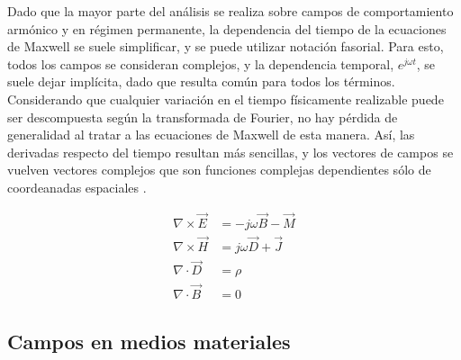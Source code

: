 Dado que la mayor parte del análisis se realiza sobre campos de comportamiento armónico y en régimen permanente, la dependencia del tiempo de la ecuaciones de Maxwell se suele simplificar, y se puede utilizar notación fasorial. Para esto, todos los campos se consideran complejos, y la dependencia temporal, $e^{j \omega t}$, se suele dejar implícita, dado que resulta común para todos los términos. Considerando que cualquier variación en el tiempo físicamente realizable puede ser descompuesta según la transformada de Fourier, no hay pérdida de generalidad al tratar a las ecuaciones de Maxwell de esta manera. Así, las derivadas respecto del tiempo resultan más sencillas, y los vectores de campos se vuelven vectores complejos que son funciones complejas dependientes sólo de coordeanadas espaciales \cite{Collin:GuidedWaves}.

\begin{subequations}
	\label{eq:maxwell_equations_harmonic}
	\begin{align}	
	\nabla \times \vec{E} & = -j \omega \vec{B} - \vec{M} \label{eq:Faraday_harmonic}\\
	\nabla \times \vec{H} & = j \omega \vec{D} + \vec{J} \label{eq:Ampere_harmonic}\\
	\nabla \cdot \vec{D} & = \rho \label{eq:Gauss_harmonic}\\
	\nabla \cdot \vec{B} & = 0
	\end{align}
\end{subequations}

\subsection{Campos en medios materiales}
\label{subsec_campos_en_dielectricos}

